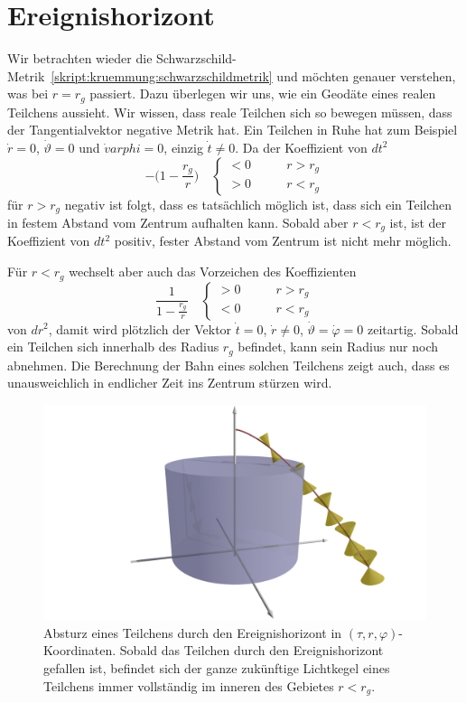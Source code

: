 \section{Ereignishorizont%
\label{skript:section:ereignishorizont}}
Wir betrachten wieder die
Schwarzschild-Metrik~\eqref{skript:kruemmung:schwarzschildmetrik}
und möchten genauer verstehen, was bei $r=r_g$ passiert.
Dazu überlegen wir uns, wie ein Geodäte eines realen Teilchens 
aussieht.
Wir wissen, dass reale Teilchen sich so bewegen müssen, dass der
Tangentialvektor negative Metrik hat.
Ein Teilchen in Ruhe hat zum Beispiel $\dot r=0$, $\dot \vartheta=0$ und
$\dot varphi=0$, einzig $\dot t\ne 0$.
Da der Koeffizient von $dt^2$
\[
-\biggl(1-\frac{r_g}{r}\biggr)
\quad
\begin{cases}
<0&\qquad r > r_g
\\
>0&\qquad r < r_g
\end{cases}
\]
für $r>r_g$
negativ ist folgt, dass es tatsächlich möglich ist, dass sich ein Teilchen
in festem Abstand vom Zentrum aufhalten kann.
Sobald aber $r<r_g$ ist, ist der Koeffizient von $dt^2$ positiv,
fester Abstand vom Zentrum ist nicht mehr möglich.

Für $r<r_g$ wechselt aber auch das Vorzeichen des Koeffizienten
\[
\frac1{\displaystyle1-\frac{r_g}{r}}
\quad
\begin{cases}
>0&\qquad r>r_g
\\
<0&\qquad r<r_g
\end{cases}
\]
von $dr^2$, damit wird plötzlich der Vektor $\dot t=0$, $\dot r\ne 0$,
$\dot\vartheta=\dot\varphi=0$ zeitartig.
Sobald ein Teilchen sich innerhalb des Radius $r_g$ befindet, kann
sein Radius nur noch abnehmen.
Die Berechnung der Bahn eines solchen Teilchens zeigt auch, dass
es unausweichlich in endlicher Zeit ins Zentrum stürzen wird.

\begin{figure}
\centering
\includegraphics[width=\hsize]{chapters/3d/blackhole.jpg}
\caption{Absturz eines Teilchens durch den Ereignishorizont in
$(\tau,r,\varphi)$-Koordinaten.
Sobald das Teilchen durch den Ereignishorizont gefallen ist,
befindet sich der ganze zukünftige Lichtkegel eines Teilchens 
immer vollständig im inneren des Gebietes $r<r_g$.
\label{skript:kruemmung:fig:blackhole}}
\end{figure}


